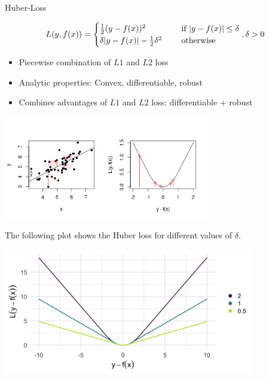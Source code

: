 \begin{vbframe}{Huber-Loss}

\vspace*{-0.3cm}

$$
L(y, f(x)) = \begin{cases}
  \frac{1}{2}(y - f(x))^2  & \text{ if } |y - f(x)| \le \delta \\
  \delta |y - f(x)|-\frac{1}{2}\delta^2 \quad & \text{ otherwise }
  \end{cases}, \delta > 0
$$

\begin{itemize}
\item Piecewise combination of $L1$ and $L2$ loss
\item Analytic properties: Convex, differentiable, robust
\item Combines advantages of $L1$ and $L2$ loss: differentiable + robust
\end{itemize}

\vspace*{-1cm}

\begin{center}
\includegraphics[width = 9cm]{figure_man/loss_huber_plot1.png} \\
\end{center}

\framebreak

The following plot shows the Huber loss for different values of $\delta$.

\begin{center}
\includegraphics[width = 11cm]{figure_man/loss_huber_plot2.png} 
\end{center}

\end{vbframe}

